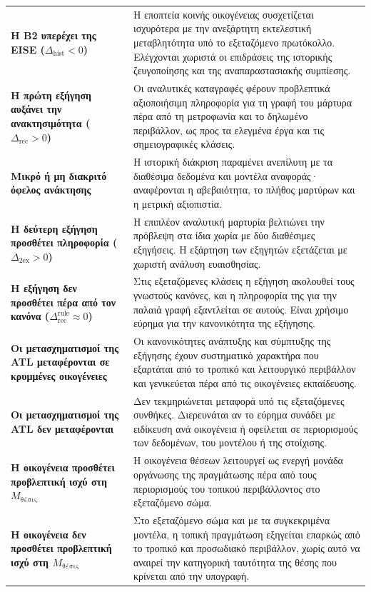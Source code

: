 \documentclass[11pt,a4paper]{article}
\begin{document}
\begin{longtable}[]{@{}
  >{\raggedright\arraybackslash}p{}
  >{\raggedright\arraybackslash}p{}@{}}
\textbf{Η B2 υπερέχει της EISE ($\Delta_{\mathrm{hist}}<0$)} & Η εποπτεία κοινής οικογένειας συσχετίζεται ισχυρότερα με την ανεξάρτητη εκτελεστική μεταβλητότητα υπό το εξεταζόμενο πρωτόκολλο. Ελέγχονται χωριστά οι επιδράσεις της ιστορικής ζευγοποίησης και της αναπαραστασιακής συμπίεσης. \\
\textbf{Η πρώτη εξήγηση αυξάνει την ανακτησιμότητα ($\Delta_{\mathrm{rec}}>0$)} & Οι αναλυτικές καταγραφές φέρουν προβλεπτικά αξιοποιήσιμη πληροφορία για τη γραφή του μάρτυρα πέρα από τη μετροφωνία και το δηλωμένο περιβάλλον, ως προς τα ελεγμένα έργα και τις σημειογραφικές κλάσεις. \\
\textbf{Μικρό ή μη διακριτό όφελος ανάκτησης} & Η ιστορική διάκριση παραμένει ανεπίλυτη με τα διαθέσιμα δεδομένα και μοντέλα αναφοράς· αναφέρονται η αβεβαιότητα, το πλήθος μαρτύρων και η μετρική αξιοπιστία. \\
\textbf{Η δεύτερη εξήγηση προσθέτει πληροφορία ($\Delta_{\mathrm{2ex}}>0$)} & Η επιπλέον αναλυτική μαρτυρία βελτιώνει την πρόβλεψη στα ίδια χωρία με δύο διαθέσιμες εξηγήσεις. Η εξάρτηση των εξηγητών εξετάζεται με χωριστή ανάλυση ευαισθησίας. \\
\textbf{Η εξήγηση δεν προσθέτει πέρα από τον κανόνα ($\Delta^{\mathrm{rule}}_{\mathrm{rec}}\approx0$)} & Στις εξεταζόμενες κλάσεις η εξήγηση ακολουθεί τους γνωστούς κανόνες, και η πληροφορία της για την παλαιά γραφή εξαντλείται σε αυτούς. Είναι χρήσιμο εύρημα για την κανονικότητα της εξήγησης. \\
\textbf{Οι μετασχηματισμοί της ATL μεταφέρονται σε κρυμμένες οικογένειες} & Οι κανονικότητες ανάπτυξης και σύμπτυξης της εξήγησης έχουν συστηματικό χαρακτήρα που εξαρτάται από το τροπικό και λειτουργικό περιβάλλον και γενικεύεται πέρα από τις οικογένειες εκπαίδευσης. \\
\textbf{Οι μετασχηματισμοί της ATL δεν μεταφέρονται} & Δεν τεκμηριώνεται μεταφορά υπό τις εξεταζόμενες συνθήκες. Διερευνάται αν το εύρημα συνάδει με ειδίκευση ανά οικογένεια ή οφείλεται σε περιορισμούς των δεδομένων, του μοντέλου ή της στοίχισης. \\
\textbf{Η οικογένεια προσθέτει προβλεπτική ισχύ στη \(M_{\text{θέσις}}\)} & Η οικογένεια θέσεων λειτουργεί ως ενεργή μονάδα οργάνωσης της πραγμάτωσης πέρα από τους περιορισμούς του τοπικού περιβάλλοντος στο εξεταζόμενο σώμα. \\
\textbf{Η οικογένεια δεν προσθέτει προβλεπτική ισχύ στη \(M_{\text{θέσις}}\)} & Στο εξεταζόμενο σώμα και με τα συγκεκριμένα μοντέλα, η τοπική πραγμάτωση εξηγείται επαρκώς από το τροπικό και προσωδιακό περιβάλλον, χωρίς αυτό να αναιρεί την κατηγορική ταυτότητα της θέσης που κρίνεται από την υπογραφή. \\
\end{longtable}
\end{document}
